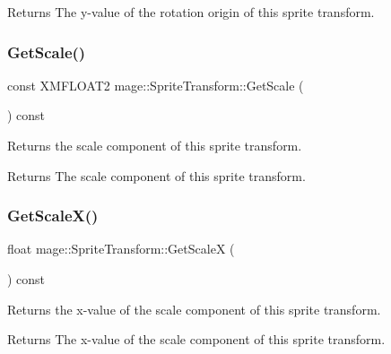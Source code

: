 \begin{DoxyReturn}{Returns}
The y-\/value of the rotation origin of this sprite transform. 
\end{DoxyReturn}
\hypertarget{structmage_1_1_sprite_transform_ac62a9a5b40abbbb40398885010990e55}{}\label{structmage_1_1_sprite_transform_ac62a9a5b40abbbb40398885010990e55} 
\subsubsection{\texorpdfstring{Get\+Scale()}{GetScale()}}
{\footnotesize\ttfamily const X\+M\+F\+L\+O\+A\+T2 mage\+::\+Sprite\+Transform\+::\+Get\+Scale (\begin{DoxyParamCaption}{ }\end{DoxyParamCaption}) const\hspace{0.3cm}{\ttfamily [noexcept]}}

Returns the scale component of this sprite transform.

\begin{DoxyReturn}{Returns}
The scale component of this sprite transform. 
\end{DoxyReturn}
\hypertarget{structmage_1_1_sprite_transform_a5ba0dc3dabd968dfd91eb11cca0b43fa}{}\label{structmage_1_1_sprite_transform_a5ba0dc3dabd968dfd91eb11cca0b43fa} 
\subsubsection{\texorpdfstring{Get\+Scale\+X()}{GetScaleX()}}
{\footnotesize\ttfamily float mage\+::\+Sprite\+Transform\+::\+Get\+ScaleX (\begin{DoxyParamCaption}{ }\end{DoxyParamCaption}) const\hspace{0.3cm}{\ttfamily [noexcept]}}

Returns the x-\/value of the scale component of this sprite transform.

\begin{DoxyReturn}{Returns}
The x-\/value of the scale component of this sprite transform. 
\end{DoxyReturn}
\hypertarget{structmage_1_1_sprite_transform_acab545ce4e0f658dc9207fb2d91aa2ab}{}\label{structmage_1_1_sprite_transform_acab545ce4e0f658dc9207fb2d91aa2ab} 
